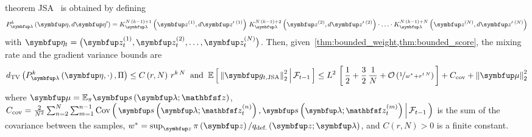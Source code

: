 
\begin{theoremEnd}{theorem}\label{thm:jsa}
  JSA~\citep{pmlr-v124-ou20a} is obtained by defining 
  {%
  \begin{align*}
  P_{\vlambda}^k\left(\veta, d\veta^{\prime}\right)
  = 
  K_{\vlambda}^{N\,\left(k-1\right) + 1}\left(\vz^{(1)}, d\vz^{\prime\;(1)}\right)
  \,
  K_{\vlambda}^{N\,\left(k-1\right) + 2}\left(\vz^{(2)}, d\vz^{\prime\;(2)}\right)
  \cdot
  \ldots 
  \cdot
  K_{\vlambda}^{N\,\left(k-1\right) + N}\left(\vz^{(N)}, d\vz^{\prime\;(N)}\right)
  \end{align*}
  }%
  with \(\veta_t = \big(\vz_t^{(1)}, \vz_t^{(2)}, \ldots, \vz_t^{(N)}\big)\).
  Then, given~\cref{thm:bounded_weight,thm:bounded_score}, the mixing rate and the gradient variance bounds are
  {\small
  \begin{align*}
    \DTV{P_{\vlambda}^k\left(\veta, \cdot\right)}{\Pi}
    \leq
    C\left(r, N\right)\,{r}^{k\,N}
    \;\;\text{and}\;\;
    \E{ {\lVert\vg_{t,\mathrm{JSA}}\rVert}^2_2 \,\middle|\, \mathcal{F}_{t-1} }
    \leq
    L^2 \,
    \left[\,
    \frac{1}{2} + \frac{3}{2}\,\frac{1}{N}
    + \mathcal{O}\left(\nicefrac{1}{w^* + r^{t\,N}}\right)
    \,\right]
    +
    C_{\text{cov}}
    +
    {\lVert\vmu\rVert}^2_2
    \nonumber
  \end{align*}
  }%
  where
  \(\vmu = \mathbb{E}_{\pi}\vs\left(\vlambda;\rvvz\right)\), 
  \(\small\textstyle
  C_{\text{cov}} = \frac{2}{N^2} \sum^{N}_{n=2} \sum^{n-1}_{m = 1} \Cov{\vs\left(\vlambda; \rvvz^{(n)}_t\right), \vs\left(\vlambda; \rvvz^{(m)}_t\right) \,\middle|\, \mathcal{F}_{t-1} }
  \) is the sum of the covariance between the samples, \(w^* = \sup_{\vz} \pi\left(\vz\right) / q_{\text{def.}}\left(\vz;\vlambda\right)\), and \(C\left(r, N\right) > 0\) is a finite constant.
\end{theoremEnd}
